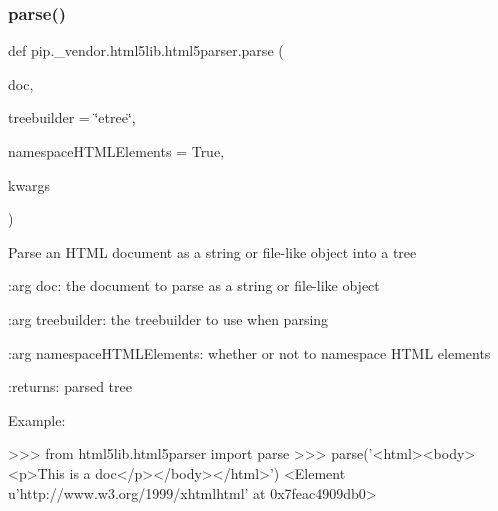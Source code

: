 \mbox{\label{namespacepip_1_1__vendor_1_1html5lib_1_1html5parser_ae565e9d5d0a8f43e8cff738384b1ad7b}} 
\subsubsection{\texorpdfstring{parse()}{parse()}}
{\footnotesize\ttfamily def pip.\+\_\+vendor.\+html5lib.\+html5parser.\+parse (\begin{DoxyParamCaption}\item[{}]{doc,  }\item[{}]{treebuilder = {\ttfamily \char`\"{}etree\char`\"{}},  }\item[{}]{namespace\+H\+T\+M\+L\+Elements = {\ttfamily True},  }\item[{}]{kwargs }\end{DoxyParamCaption})}

\begin{DoxyVerb}Parse an HTML document as a string or file-like object into a tree

:arg doc: the document to parse as a string or file-like object

:arg treebuilder: the treebuilder to use when parsing

:arg namespaceHTMLElements: whether or not to namespace HTML elements

:returns: parsed tree

Example:

>>> from html5lib.html5parser import parse
>>> parse('<html><body><p>This is a doc</p></body></html>')
<Element u'{http://www.w3.org/1999/xhtml}html' at 0x7feac4909db0>\end{DoxyVerb}
 \mbox{\label{namespacepip_1_1__vendor_1_1html5lib_1_1html5parser_a8e8ea380817e3400dbda236e66ea6147}} 
